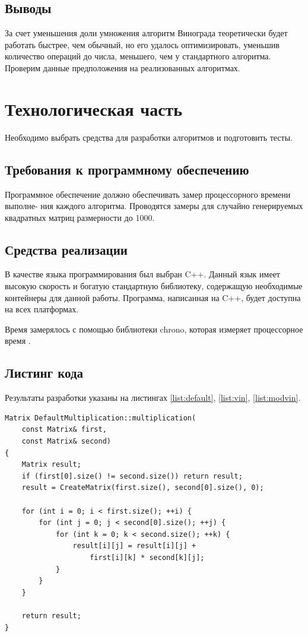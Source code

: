 \documentclass[a4paper,12pt]{article}
\begin{document}
\subsection{Выводы}

За счет уменьшения доли умножения алгоритм Винограда теоретически будет работать быстрее,
чем обычный, но его удалось оптимизировать, уменьшив количество операций до числа,
меньшего, чем у стандартного алгоритма. Проверим данные предположения на реализованных
алгоритмах.

\newpage
\section{Технологическая часть}

Необходимо выбрать средства для разработки алгоритмов и подготовить тесты.

\subsection{Требования к программному обеспечению}

Программное обеспечение должно обеспечивать замер процессорного времени выполне- ния каждого алгоритма. Проводятся замеры для случайно генерируемых квадратных матриц
размерности до 1000.

\subsection{Средства реализации}

В качестве языка программирования был выбран C++.
Данный язык имеет высокую скорость и богатую стандартную библиотеку,
содержащую необходимые контейнеры для данной работы. Программа, написанная на C++,
будет доступна на всех платформах.

Время замерялось с помощью библиотеки chrono, которая измеряет процессорное время \cite{chrono}.

\subsection{Листинг кода}

Результаты разработки указаны на листингах \ref{list:default}, \ref{list:vin},
\ref{list:modvin}.

\begin{lstlisting}[caption=Стандартный алгоритм умножения матриц,label=list:default]
Matrix DefaultMultiplication::multiplication(
    const Matrix& first,
    const Matrix& second)
{
    Matrix result;
    if (first[0].size() != second.size()) return result;
    result = CreateMatrix(first.size(), second[0].size(), 0);

    for (int i = 0; i < first.size(); ++i) {
        for (int j = 0; j < second[0].size(); ++j) {
            for (int k = 0; k < second.size(); ++k) {
                result[i][j] = result[i][j] +
                    first[i][k] * second[k][j];
            }
        }
    }

    return result;
}
\end{lstlisting}
\end{document}

